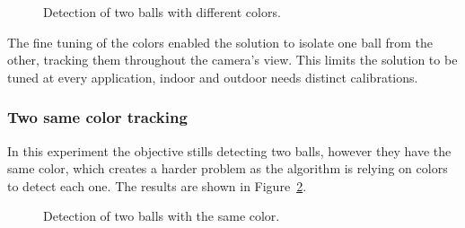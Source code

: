 \documentclass[10pt,twocolumn,letterpaper]{article}
\begin{document}
\begin{figure}[!h]
\centering
\setlength{\fboxsep}{1pt}
\setlength{\fboxrule}{1pt}
\caption{Detection of two balls with different colors.}\label{fig:diff_color}
\end{figure}

The fine tuning of the colors enabled the solution to isolate one ball from the other, tracking them throughout the camera's view. This limits the solution to be tuned at every application, indoor  and outdoor needs
distinct calibrations.

\subsubsection{Two same color tracking}

In this experiment the objective stills detecting two balls, however they have the same color, which creates a harder problem as the algorithm is relying on colors to detect each one. The results are shown in Figure~\ref{fig:same_color}.

\begin{figure}[!h]
\centering
\setlength{\fboxsep}{1pt}
\setlength{\fboxrule}{1pt}
\caption{Detection of two balls with the same color.}\label{fig:same_color}
\end{figure}
\end{document}
